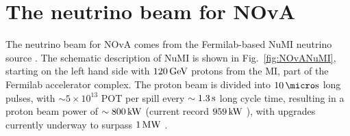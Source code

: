\section{The neutrino beam for NOvA}\label{sec:NuMI}

The neutrino beam for \gls{NOvA} comes from the \gls{Fermilab}-based \gls{NuMI} neutrino source \cite{NuMI.pdf}. The schematic description of \gls{NuMI} is shown in Fig.~\ref{fig:NOvANuMI}, starting on the left hand side with $\unit[120]{GeV}$ protons from the \gls{MI}, part of the \gls{Fermilab} accelerator complex. The proton beam is divided into $\unit[10]{\micro s}$ long pulses, with $\sim5\times10^{13}$ \gls{POT} per spill every $\sim\unit[1.3]{s}$ long cycle time, resulting in a proton beam power of $\sim\unit[800]{kW}$ (current record $\unit[959]{kW}$ \cite{FermilabRecordsWebpage}), with upgrades currently underway to surpass $\unit[1]{MW}$ \cite{NuMIUpgradeToMWProceedings2022.pdf}.

